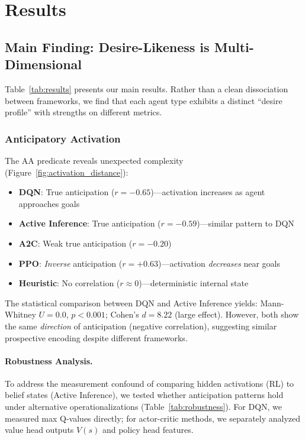 \documentclass{article}
\begin{document}
\section{Results}

\subsection{Main Finding: Desire-Likeness is Multi-Dimensional}



Table~\ref{tab:results} presents our main results. Rather than a clean dissociation between frameworks, we find that each agent type exhibits a distinct ``desire profile'' with strengths on different metrics.

\subsubsection{Anticipatory Activation}

The AA predicate reveals unexpected complexity (Figure~\ref{fig:activation_distance}):

\begin{itemize}
    \item \textbf{DQN}: True anticipation ($r = -0.65$)---activation increases as agent approaches goals
    \item \textbf{Active Inference}: True anticipation ($r = -0.59$)---similar pattern to DQN
    \item \textbf{A2C}: Weak true anticipation ($r = -0.20$)
    \item \textbf{PPO}: \textit{Inverse} anticipation ($r = +0.63$)---activation \textit{decreases} near goals
    \item \textbf{Heuristic}: No correlation ($r \approx 0$)---deterministic internal state
\end{itemize}

The statistical comparison between DQN and Active Inference yields: Mann-Whitney $U = 0.0$, $p < 0.001$; Cohen's $d = 8.22$ (large effect). However, both show the same \textit{direction} of anticipation (negative correlation), suggesting similar prospective encoding despite different frameworks.

\paragraph{Robustness Analysis.} To address the measurement confound of comparing hidden activations (RL) to belief states (Active Inference), we tested whether anticipation patterns hold under alternative operationalizations (Table~\ref{tab:robustness}). For DQN, we measured max Q-values directly; for actor-critic methods, we separately analyzed value head outputs $V(s)$ and policy head features.
\end{document}

